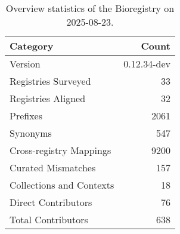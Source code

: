 \begin{table}
\caption{Overview statistics of the Bioregistry on 2025-08-23.}
\label{tab:bioregistry-summary}
\begin{tabular}{lr}
\toprule
Category & Count \\
\midrule
Version & 0.12.34-dev \\
Registries Surveyed & 33 \\
Registries Aligned & 32 \\
Prefixes & 2061 \\
Synonyms & 547 \\
Cross-registry Mappings & 9200 \\
Curated Mismatches & 157 \\
Collections and Contexts & 18 \\
Direct Contributors & 76 \\
Total Contributors & 638 \\
\bottomrule
\end{tabular}
\end{table}
